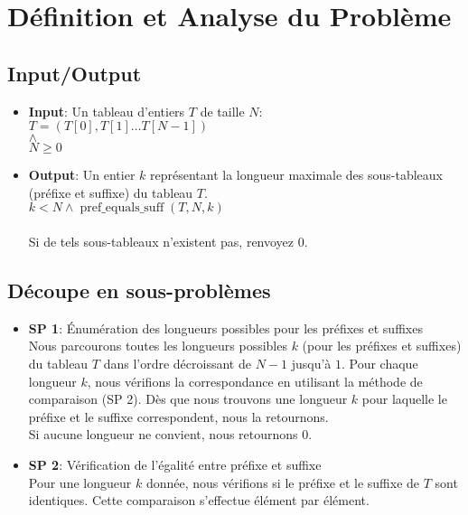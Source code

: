 %

\section{Définition et Analyse du Problème}\label{analyse}


\subsection{Input/Output}

\begin{itemize}
\item \textbf{Input}:
    Un tableau d'entiers $T$ de taille $N$: \\
    $ T = (T[0], T[1] \dots T[N - 1]) $ \\
    $ \land $ \\
    $ N \geq 0 $

\item \textbf{Output}:
    Un entier $k$ représentant la longueur maximale des sous-tableaux (préfixe et suffixe)
    du tableau $T$. \\
    $k < N \land \operatorname{pref\_equals\_suff}(T, N, k)$ \\
    \\
    Si de tels sous-tableaux n'existent pas, renvoyez 0.
\end{itemize}


\subsection{Découpe en sous-problèmes}

\begin{itemize}
\item \textbf{SP 1}: Énumération des longueurs possibles pour les préfixes et suffixes \\
    Nous parcourons toutes les longueurs possibles $k$ (pour les préfixes et suffixes)
    du tableau $T$ dans l'ordre décroissant de $N-1$ jusqu’à $1$.
    Pour chaque longueur $k$, nous vérifions la correspondance en utilisant la méthode de comparaison (SP 2).
    Dès que nous trouvons une longueur $k$ pour laquelle le préfixe et le suffixe correspondent,
    nous la retournons. \\
    Si aucune longueur ne convient, nous retournons 0.

\item \textbf{SP 2}: Vérification de l’égalité entre préfixe et suffixe \\
    Pour une longueur $k$ donnée,
    nous vérifions si le préfixe et le suffixe de $T$ sont identiques.
    Cette comparaison s’effectue élément par élément.

\end{itemize}
